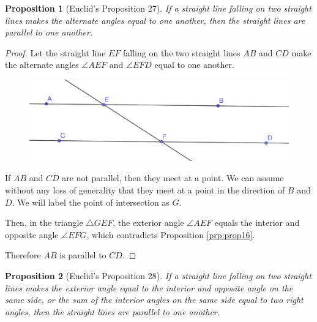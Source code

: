 \documentclass[
]{book}
\newtheorem{proposition}{Proposition}[chapter]
\theoremstyle{definition}
\theoremstyle{definition}
\theoremstyle{definition}
\theoremstyle{definition}
\theoremstyle{remark}
\begin{document}
\begin{proposition}[Euclid's Proposition 27]
\protect\hypertarget{prp:prop27}{}\label{prp:prop27}If a straight line falling on two straight lines makes the alternate angles equal to one another, then the straight lines are parallel to one another.
\end{proposition}

\begin{proof}
Let the straight line \(EF\) falling on the two straight lines \(AB\) and \(CD\) make the alternate angles \(\angle AEF\) and \(\angle EFD\) equal to one another.

\begin{figure}

{\centering \includegraphics[width=0.75\linewidth]{images/Prop27} 

}

\end{figure}

If \(AB\) and \(CD\) are not parallel, then they meet at a point. We can assume without any loss of generality that they meet at a point in the direction of \(B\) and \(D\). We will label the point of intersection as \(G\).

Then, in the triangle \(\triangle GEF\), the exterior angle \(\angle AEF\) equals the interior and opposite angle \(\angle EFG\), which contradicts Proposition \ref{prp:prop16}.

Therefore \(AB\) is parallel to \(CD\).
\end{proof}

\begin{proposition}[Euclid's Proposition 28]
\protect\hypertarget{prp:prop28}{}\label{prp:prop28}If a straight line falling on two straight lines makes the exterior angle equal to the interior and opposite angle on the same side, or the sum of the interior angles on the same side equal to two right angles, then the straight lines are parallel to one another.
\end{proposition}
\end{document}
